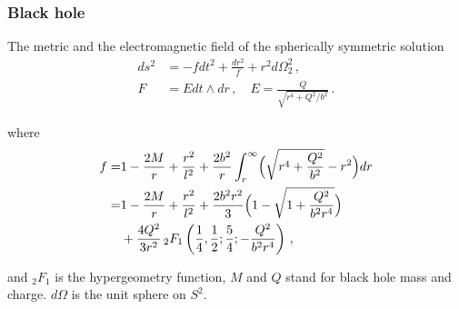 \documentclass[9pt, dvipsnames]{beamer} %
\begin{document}

    \begin{frame}
        \frametitle{\textbf{Black hole}}
        \begin{exampleblock}{The metric and the electromagnetic field of the spherically symmetric solution}
            \begin{align}
                ds^2&=-fdt^2+\frac{dr^2}{f}+r^2 d\Omega_2^2\,,\label{BImetric}\\
                F&=Edt\wedge dr\label{BIE}\,, \quad E=\frac{Q}{\sqrt{r^4+Q^2/b^2}}\,.
            \end{align}
        \end{exampleblock}

        where
        \begin{equation}
            \begin{split}
                f=&1-\frac{2M}{r}+\frac{r^2}{l^2}+\frac{2b^2}{r}\int_r^\infty \Bigl(\sqrt{r^4+\frac{Q^2}{b^2}}-r^2\Bigr)dr\nonumber\\
                =&1-\frac{2M}{r}+\frac{r^2}{l^2}+\frac{2b^2 r^2}{3}\Bigl(1-\sqrt{1+\frac{Q^2}{b^2 r^4}}\Bigr)\nonumber\\
                &+\frac{4Q^2}{3r^2}\,{}_2 F_1\left(\frac{1}{4},\frac{1}{2}; \frac{5}{4};-\frac{Q^2}{b^2 r^4}\right)\,,
            \end{split}
        \end{equation}

        and $_2 F_1$ is the hypergeometry function, $M$ and $Q$ stand for black hole mass and charge. $d\Omega$ is the unit sphere on $S^2$.
    \end{frame}
\end{document}
